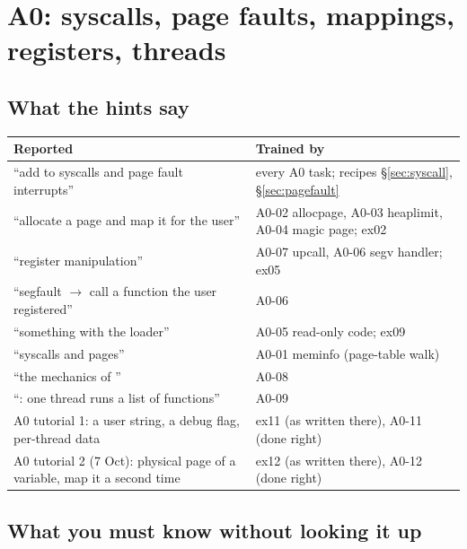 \chapter{A0: syscalls, page faults, mappings, registers, threads}
\label{ch:a0}

\section{What the hints say}

\begin{center}
\small
\begin{tabular}{L{6.6cm}L{8.2cm}}
\toprule
\textbf{Reported} & \textbf{Trained by} \\
\midrule
``add to syscalls and page fault interrupts'' & every A0 task; recipes \S\ref{sec:syscall}, \S\ref{sec:pagefault} \\
``allocate a page and map it for the user'' & A0-02 allocpage, A0-03 heaplimit, A0-04 magic page; ex02 \\
``register manipulation'' & A0-07 upcall, A0-06 segv handler; ex05 \\
``segfault $\to$ call a function the user registered'' & A0-06 \\
``something with the loader'' & A0-05 read-only code; ex09 \\
``syscalls and pages'' & A0-01 meminfo (page-table walk) \\
``the mechanics of '' & A0-08 \\
``: one thread runs a list of functions'' & A0-09 \\
A0 tutorial 1: a user string, a debug flag, per-thread data & ex11 (as written there), A0-11 (done right) \\
A0 tutorial 2 (7 Oct): physical page of a variable, map it a second time & ex12 (as written there), A0-12 (done right) \\
\bottomrule
\end{tabular}
\end{center}

\section{What you must know without looking it up}

